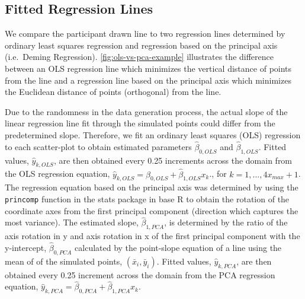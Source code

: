 \documentclass[12pt]{article}
\begin{document}
\hypertarget{fitted-regression-lines}{%
\subsection{Fitted Regression Lines}\label{fitted-regression-lines}}

We compare the participant drawn line to two regression lines determined
by ordinary least squares regression and regression based on the
principal axis (i.e.~Deming Regression). \cref{fig:ols-vs-pca-example}
illustrates the difference between an OLS regression line which
minimizes the vertical distance of points from the line and a regression
line based on the principal axis which minimizes the Euclidean distance
of points (orthogonal) from the line.

Due to the randomness in the data generation process, the actual slope
of the linear regression line fit through the simulated points could
differ from the predetermined slope. Therefore, we fit an ordinary least
squares (OLS) regression to each scatter-plot to obtain estimated
parameters \(\hat\beta_{0,OLS}\) and \(\hat\beta_{1,OLS}\). Fitted
values, \(\hat y_{k,OLS}\), are then obtained every 0.25 increments
across the domain from the OLS regression equation,
\(\hat y_{k,OLS} = \hat\beta_{0,OLS} + \hat\beta_{1,OLS} x_k\)., for
\(k = 1, ..., 4 x_{max} +1\). The regression equation based on the
principal axis was determined by using the \texttt{princomp} function in
the stats package in base R to obtain the rotation of the coordinate
axes from the first principal component (direction which captures the
most variance). The estimated slope, \(\hat\beta_{1,PCA}\), is
determined by the ratio of the axis rotation in y and axis rotation in x
of the first principal component with the y-intercept,
\(\hat\beta_{0,PCA}\) calculated by the point-slope equation of a line
using the mean of of the simulated points, \((\bar x_i, \bar y_i)\).
Fitted values, \(\hat y_{k,PCA}\), are then obtained every 0.25
increment across the domain from the PCA regression equation,
\(\hat y_{k,PCA} = \hat\beta_{0,PCA} + \hat\beta_{1,PCA} x_k\).
\end{document}
